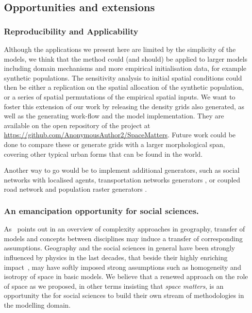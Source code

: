 \documentclass{JASSS}
\begin{document}
\subsection{Opportunities and extensions}


\subsubsection{Reproducibility and Applicability} 


Although the applications we present here are limited by the simplicity of the models, we think that the method could (and should) be applied to larger models including domain mechanisms and more empirical initialisation data, for example synthetic populations. The sensitivity analysis to initial spatial conditions could then be either a replication on the spatial allocation of the synthetic population, or a series of spatial permutations of the empirical spatial inputs.
We want to foster this extension of our work by releasing the density grids also generated, as well as the generating work-flow and the model implementation. They are available on the open repository of the project at \url{https://github.com/AnonymousAuthor2/SpaceMatters}. Future work could be done to compare these or generate grids with a larger morphological span, covering other typical urban forms that can be found in the world.

Another way to go would be to implement additional generators, such as social networks \citep{alizadeh2016generating} with localised agents, transportation networks generators \citep{raimbault2018multi}, or coupled road network and population raster generators \citep{raimbault2018urban}.


\subsubsection{An emancipation opportunity for social sciences.}


As~\citet{pumain2003approche} points out in an overview of complexity approaches in geography, transfer of models and concepts between disciplines may induce a transfer of corresponding assumptions. Geography and the social sciences in general have been strongly influenced by physics in the last decades, that beside their highly enriching impact~\citep{o2015physicists}, may have softly imposed strong assumptions such as homogeneity and isotropy of space in basic models. We believe that a renewed approach on the role of space as we proposed, in other terms insisting that \emph{space matters}, is an opportunity the for social sciences to build their own stream of methodologies in the modelling domain.
\end{document}
